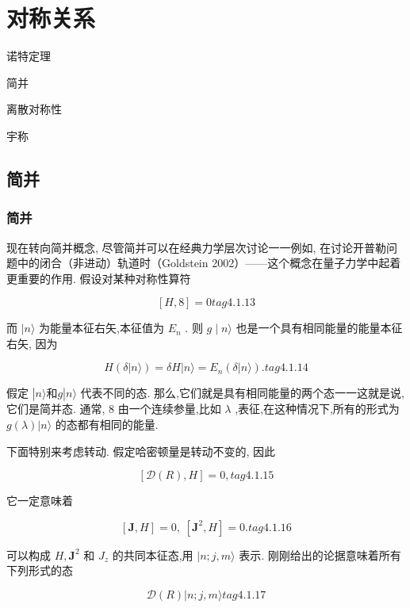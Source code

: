 \ifx\allfiles\undefined



	\else
	\fi
\chapter{对称关系}
\begin{introduction}
	\item 诺特定理
	\item 简并
	\item 离散对称性
	\item 宇称
\end{introduction}
\section{简并}
\subsection{简并}
现在转向简并概念, 尽管简并可以在经典力学层次讨论一一例如, 在讨论开普勒问题中的闭合（非进动）轨道时（Goldstein 2002）——这个概念在量子力学中起着更重要的作用. 假设对某种对称性算符

$$
\left\lbrack {H,8}\right\rbrack = 0 tag{4.1.13}
$$

而 $|n\rangle$ 为能量本征右矢,本征值为 ${E}_{n}$ . 则 $g \mid n\rangle$ 也是一个具有相同能量的能量本征右矢, 因为

$$
H\left( {\delta |n\rangle }\right) = {\delta H}|n\rangle = {E}_{n}\left( {\delta |n\rangle }\right) . tag{4.1.14}
$$

假定 $\left| {n\rangle \text{和}g}\right| n\rangle$ 代表不同的态. 那么,它们就是具有相同能量的两个态一一这就是说, 它们是简并态. 通常, $8$ 由一个连续参量,比如 $\lambda$ ,表征,在这种情况下,所有的形式为 $g\left( \lambda \right) |n\rangle$ 的态都有相同的能量.

下面特别来考虑转动. 假定哈密顿量是转动不变的, 因此

$$
\left\lbrack {\mathcal{D}\left( R\right), H}\right\rbrack = 0, tag{4.1.15}
$$

它一定意味着

$$
\left\lbrack {\mathbf{J}, H}\right\rbrack = 0,\;\left\lbrack {{\mathbf{J}}^{2}, H}\right\rbrack = 0. tag{4.1.16}
$$

可以构成 $H,{\mathbf{J}}^{2}$ 和 ${J}_{z}$ 的共同本征态,用 $|n;j, m\rangle$ 表示. 刚刚给出的论据意味着所有下列形式的态

$$
\mathcal{D}\left( R\right) |n;j, m\rangle tag{4.1.17}
$$

